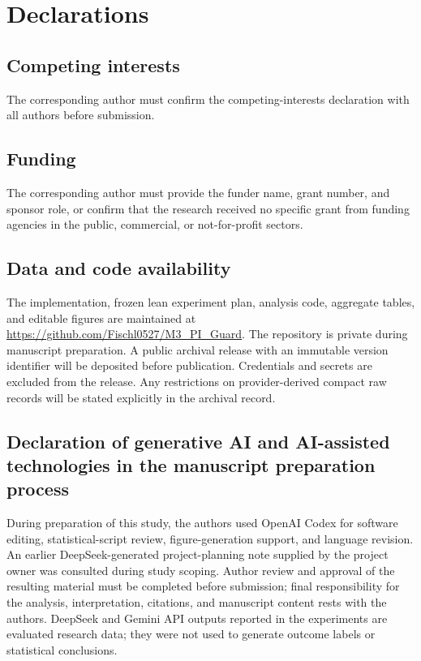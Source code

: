 \section*{Declarations}


\subsection*{Competing interests}

The corresponding author must confirm the competing-interests declaration with all authors before submission.

\subsection*{Funding}

The corresponding author must provide the funder name, grant number, and sponsor role, or confirm that the research received no specific grant from funding agencies in the public, commercial, or not-for-profit sectors.

\subsection*{Data and code availability}

The implementation, frozen lean experiment plan, analysis code, aggregate tables, and editable figures are maintained at \url{https://github.com/Fischl0527/M3_PI_Guard}. The repository is private during manuscript preparation. A public archival release with an immutable version identifier will be deposited before publication. Credentials and secrets are excluded from the release. Any restrictions on provider-derived compact raw records will be stated explicitly in the archival record.

\subsection*{Declaration of generative AI and AI-assisted technologies in the manuscript preparation process}

During preparation of this study, the authors used OpenAI Codex for software editing, statistical-script review, figure-generation support, and language revision. An earlier DeepSeek-generated project-planning note supplied by the project owner was consulted during study scoping. Author review and approval of the resulting material must be completed before submission; final responsibility for the analysis, interpretation, citations, and manuscript content rests with the authors. DeepSeek and Gemini API outputs reported in the experiments are evaluated research data; they were not used to generate outcome labels or statistical conclusions.

